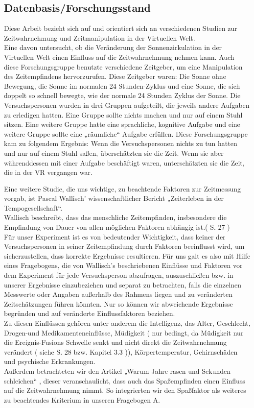 \documentclass{Paper}
\begin{document}
\subsection{Datenbasis/Forschungsstand}
Diese Arbeit bezieht sich auf und orientiert sich an verschiedenen Studien zur Zeitwahrnehmung und Zeitmanipulation in der Virtuellen Welt. \\
Eine davon untersucht, ob die Veränderung der Sonnenzirkulation in der Virtuellen Welt einen Einfluss auf die Zeitwahrnehmung nehmen kann. Auch diese Forschungsgruppe benutzte verschiedene Zeitgeber, um eine Manipulation des Zeitempfindens hervorzurufen. Diese Zeitgeber waren: Die Sonne ohne Bewegung, die Sonne im normalen 24 Stunden-Zyklus und eine Sonne, die sich doppelt so schnell bewegte, wie der normale 24 Stunden Zyklus der Sonne. Die Versuchspersonen wurden in drei Gruppen aufgeteilt, die jeweils andere Aufgaben zu erledigen hatten. Eine Gruppe sollte nichts machen und nur auf einem Stuhl sitzen. Eine weitere Gruppe hatte eine sprachliche, kognitive Aufgabe und eine weitere Gruppe sollte eine „räumliche“ Aufgabe erfüllen.
Diese Forschungsgruppe kam zu folgendem Ergebnis: Wenn die Versuchspersonen nichts zu tun hatten und nur auf einem Stuhl saßen, überschätzten sie die Zeit. Wenn sie aber währenddessen mit einer Aufgabe beschäftigt waren, unterschätzten sie die Zeit, die in der VR vergangen war.
\par
Eine weitere Studie, die uns wichtige, zu beachtende Faktoren zur Zeitmessung vorgab, ist Pascal Wallisch' wissenschaftlicher Bericht „Zeiterleben in der Tempogesellschaft“.  \\
Wallisch beschreibt, \glqq dass das menschliche Zeitempfinden, insbesondere die Empfindung von Dauer von allen möglichen Faktoren abhängig ist\grqq .( S. 27 ) \\
Für unser Experiment ist es von bedeutender Wichtigkeit, dass keiner der Versuchspersonen in seiner Zeitempfindung durch Faktoren beeinflusst wird, um sicherzustellen, dass korrekte Ergebnisse resultieren.
Für uns galt es also mit Hilfe eines Fragebogens, die von Wallisch’s beschriebenen Einflüsse und Faktoren vor dem Experiment für jede Versuchsperson abzufragen, auszuschließen bzw. in unserer Ergebnisse einzubeziehen und separat zu betrachten, falls die einzelnen Messwerte oder Angaben außerhalb des Rahmens liegen und zu veränderten Zeitschätzungen führen könnten. Nur so können wir abweichende Ergebnisse begründen und auf veränderte Einflussfaktoren beziehen.\\
Zu diesen Einflüssen gehören unter anderem die Intelligenz, das Alter, Geschlecht, Drogen-und Medikamenteneinflüsse, Müdigkeit ( nur bedingt, da Müdigkeit nur die Ereignis-Fusions Schwelle senkt und nicht direkt die Zeitwahrnehmung verändert ( siehe S. 28 bzw. Kapitel 3.3 )), Körpertemperatur, Gehirnschäden und psychische Erkrankungen.
\\Außerdem betrachteten wir den Artikel „Warum Jahre rasen und Sekunden schleichen“ , dieser veranschaulicht, dass auch das Spaßempfinden einen Einfluss auf die Zeitwahrnehmung nimmt. So integrierten wir den Spaßfaktor als weiteres zu beachtendes Kriterium in unseren Fragebogen A.
\end{document}
